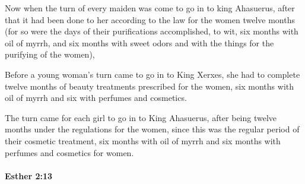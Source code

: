			\begin{versebox}
					\item[BHS] 
					\item[LXX] 
					\item[ASV] Now when the turn of every maiden was come to go in to king Ahasuerus, after that it had been done to her according to the law for the women twelve months (for so were the days of their purifications accomplished, to wit, six months with oil of myrrh, and six months with sweet odors and with the things for the purifying of the women),
					\item[NIV] Before a young woman’s turn came to go in to King Xerxes, she had to complete twelve months of beauty treatments prescribed for the women, six months with oil of myrrh and six with perfumes and cosmetics.
					\item[NRSV] The turn came for each girl to go in to King Ahasuerus, after being twelve months under the regulations for the women, since this was the regular period of their cosmetic treatment, six months with oil of myrrh and six months with perfumes and cosmetics for women.
			\end{versebox}

		\paragraph{Esther 2:13} %
			\label{ESTHER-2-13}

